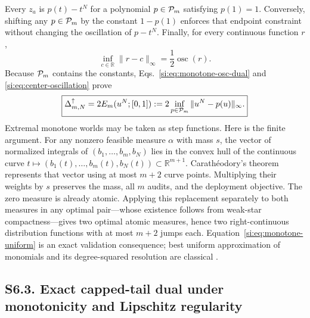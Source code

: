 Every $z_a$ is $p(t)-t^N$ for a polynomial $p\in\mathcal P_m$ satisfying $p(1)=1$. Conversely, shifting any $p\in\mathcal P_m$ by the constant $1-p(1)$ enforces that endpoint constraint without changing the oscillation of $p-t^N$. Finally, for every continuous function $r$,
\begin{equation}
\inf_{c\in\mathbb R}\|r-c\|_\infty
=\frac12\operatorname{osc}(r).
\label{si:eq:center-oscillation}
\end{equation}
Because $\mathcal P_m$ contains the constants, Eqs.~\ref{si:eq:monotone-osc-dual} and \ref{si:eq:center-oscillation} prove
\begin{equation}
\boxed{\Delta^\uparrow_{m,N}
=2E_m(u^N;[0,1])
:=2\inf_{p\in\mathcal P_m}\|u^N-p(u)\|_\infty.}
\label{si:eq:monotone-uniform}
\end{equation}
Extremal monotone worlds may be taken as step functions. Here is the finite
argument. For any nonzero feasible measure $\alpha$ with mass $s$, the vector
of normalized integrals of $(b_1,\ldots,b_m,b_N)$ lies in the convex hull of
the continuous curve $t\mapsto(b_1(t),\ldots,b_m(t),b_N(t))\subset\mathbb R^{m+1}$.
Carath\'eodory's theorem represents that vector using at most $m+2$ curve
points. Multiplying their weights by $s$ preserves the mass, all $m$ audits,
and the deployment objective. The zero measure is already atomic. Applying
this replacement separately to both measures in any optimal pair---whose
existence follows from weak-star compactness---gives two optimal atomic
measures, hence two right-continuous distribution functions with at most
$m+2$ jumps each. Equation~\ref{si:eq:monotone-uniform} is an exact validation consequence; best uniform approximation of monomials and its degree-squared resolution are classical \citep[main result, pp.~451--455]{newman1976}.

\subsection*{S6.3. Exact capped-tail dual under monotonicity and Lipschitz regularity}

